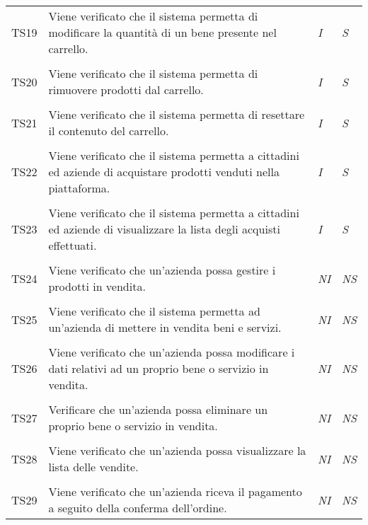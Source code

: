 \begin{longtable}{ >{\centering}p{} >{}p{}
			>{\centering}p{} >{\centering}p{}}
		\tabularnewline
		\hypertarget{TS19}{TS19} & Viene verificato che il sistema permetta di 
		modificare la quantità di un bene presente nel carrello. & 
		\textit{I} & \textit{S}\\ 

		\tabularnewline
		\hypertarget{TS20}{TS20} & Viene verificato che il sistema permetta di 
		rimuovere prodotti dal carrello. & \textit{I} & \textit{S}\\ 

		\tabularnewline
		\hypertarget{TS21}{TS21} & Viene verificato che il sistema permetta di 
		resettare il contenuto del carrello. & \textit{I} & \textit{S}\\ 

		\tabularnewline
		\hypertarget{TS22}{TS22} & Viene verificato che il sistema permetta 
		a 
		cittadini ed aziende di acquistare prodotti venduti nella piattaforma. & 
		\textit{I} & \textit{S}\\ 

		\tabularnewline
		\hypertarget{TS23}{TS23} & Viene verificato che il sistema permetta a 
		cittadini ed aziende di visualizzare la lista degli acquisti effettuati. & 
		\textit{I} & \textit{S}\\ 

		\tabularnewline
		\hypertarget{TS24}{TS24} & Viene verificato che un'azienda possa gestire i 
		prodotti in vendita. & \textit{NI} & \textit{NS}\\ 

		\tabularnewline
		\hypertarget{TS25}{TS25} & Viene verificato che il sistema permetta ad 
		un'azienda di mettere in vendita beni e servizi. & \textit{NI} & \textit{NS}\\ 

		\tabularnewline
		\hypertarget{TS26}{TS26} & Viene verificato che un'azienda possa 
		modificare i dati relativi ad un proprio bene o servizio in vendita. & 
		\textit{NI} & \textit{NS}\\ 

		\tabularnewline
		\hypertarget{TS27}{TS27} & Verificare che un'azienda possa eliminare un 
		proprio bene o servizio in vendita. & \textit{NI} & \textit{NS}\\ 

		\tabularnewline
		\hypertarget{TS28}{TS28} & Viene verificato che un'azienda possa 
		visualizzare la lista delle vendite. & \textit{NI} & \textit{NS}\\ 

		\tabularnewline
		\hypertarget{TS29}{TS29} & Viene verificato che un'azienda riceva il 
		pagamento a seguito della conferma dell'ordine. & \textit{NI} & \textit{NS}\\ 


\end{longtable}
